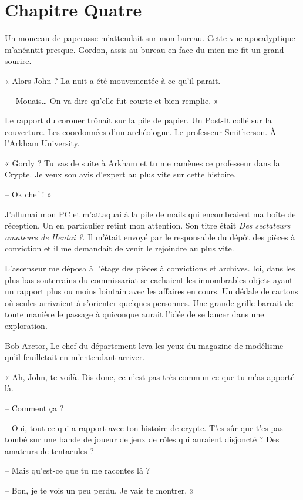 \chapter[Chapitre Quatre]{Chapitre Quatre}

Un monceau de paperasse m'attendait sur mon bureau. Cette vue apocalyptique m'anéantit presque. Gordon, assis au bureau  
en face du mien me fit un grand sourire.

« Alors John ? La nuit a été mouvementée à ce qu'il parait.

— Mouais… On va dire qu'elle fut courte et bien remplie. »

Le rapport du coroner trônait sur la pile de papier. Un Post-It collé sur la couverture. Les coordonnées d'un
archéologue. Le professeur Smitherson. À l'Arkham University.

« Gordy ? Tu vas de suite à Arkham et tu me ramènes ce professeur dans la Crypte. Je veux son avis d'expert au plus
vite sur cette histoire.

-- Ok chef ! »

J'allumai mon PC et m'attaquai à la pile de mails qui encombraient ma boîte de réception. Un en particulier retint mon
attention. Son titre était \emph{Des sectateurs amateurs de Hentai ?}. Il m'était envoyé par le responsable du dépôt des 
pièces à conviction et il me demandait de venir le rejoindre au plus vite.

L'ascenseur me déposa à l'étage des pièces à convictions et archives. Ici, dans les plus bas souterrains du commissariat se
cachaient les innombrables objets ayant un rapport plus ou moins lointain avec les affaires en cours. Un dédale de
cartons où seules arrivaient à s'orienter quelques personnes. Une grande grille barrait de toute manière le passage à
quiconque aurait l'idée de se lancer dans une exploration.

Bob Arctor, Le chef du département leva les yeux du magazine de modélisme qu'il feuilletait en m'entendant arriver.

« Ah, John, te voilà. Dis donc, ce n'est pas très commun ce que tu m'as apporté là.

-- Comment ça ?

-- Oui, tout ce qui a rapport avec ton histoire de crypte. T'es sûr que t'es pas tombé sur une bande de joueur de jeux
de rôles qui auraient disjoncté ? Des amateurs de tentacules ?

-- Mais qu'est-ce que tu me racontes là ?

-- Bon, je te vois un peu perdu. Je vais te montrer. »

